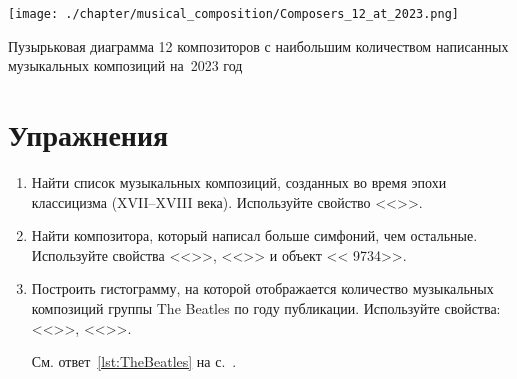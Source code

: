 \newpage
\begin{marginfigure}
  \texttt{[image: ./chapter/musical\_composition/Composers\_12\_at\_2023.png]}
  \caption[Диаграмма 12 композиторов с наибольшим количеством написанных музыкальных композиций на~2023 год]
          {Пузырьковая диаграмма 12 композиторов с наибольшим количеством написанных музыкальных композиций на~2023 год}%
  \label{fig:12composers}%
\end{marginfigure}


\section{Упражнения}
\begin{enumerate}
\item Найти список музыкальных композиций, созданных во время эпохи классицизма (XVII--XVIII века).
Используйте свойство <<>>.
\item Найти композитора, который написал больше симфоний, чем остальные. 
    Используйте свойства <<>>, <<>>
        и объект << {9734}>>.
\item Построить гистограмму, на которой отображается количество музыкальных композиций 
        группы The Beatles по году публикации.
        Используйте свойства: <<>>, <<>>.

        \label{question:TheBeatkes_quest}
        См. ответ~\ref{lst:TheBeatles} на с.~\pageref{answer:TheBeatles_answ}.


\end{enumerate}
